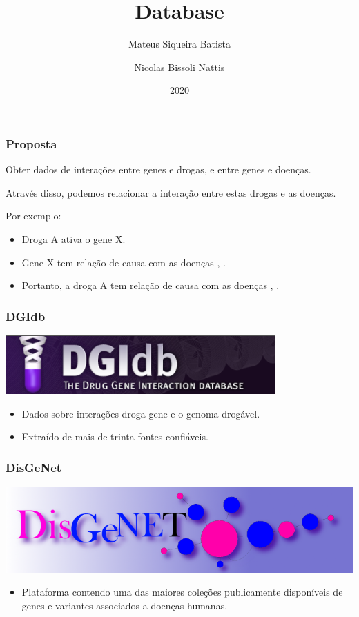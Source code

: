\documentclass[12pt]{beamer}
\title[Database]{Database}
\author{
  Mateus Siqueira Batista\and
  Nicolas Bissoli Nattis
}
\institute{
  MC536 - Instituto de Computação, UNICAMP
}
\date[2020]{2020}
\begin{document}
\frame{\titlepage}

\begin{frame}
  \frametitle{Proposta}
  Obter dados de interações entre genes e drogas, e entre genes e doenças.
  \pause

  Através disso, podemos relacionar a interação entre estas drogas e as doenças.
  \pause

  Por exemplo:
  \begin{itemize}
    \item Droga A ativa o gene X.
    \item Gene X tem relação de causa com as doenças \textalpha, \textgamma.
    \item Portanto, a droga A tem relação de causa com as doenças \textalpha, \textgamma.
  \end{itemize}
\end{frame}

\begin{frame}
  \frametitle{DGIdb}
  \centering
  \includegraphics[scale=0.5]{dgi}
  \vspace*{1 cm}
  \begin{itemize}
    \item Dados sobre interações droga-gene e o genoma drogável.
    \item Extraído de mais de trinta fontes confiáveis.
  \end{itemize}
\end{frame}

\begin{frame}
  \frametitle{DisGeNet}
  \centering
  \includegraphics[scale=0.25]{disgenet}
  \vspace*{1 cm}
  \begin{itemize}
    \item Plataforma contendo uma das maiores coleções publicamente disponíveis
          de genes e variantes associados a doenças humanas.
  \end{itemize}
\end{frame}
\end{document}

